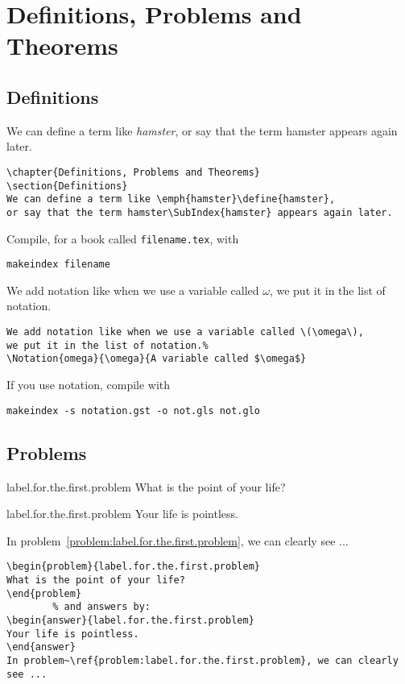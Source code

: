 \chapter{Definitions, Problems and Theorems}
\section{Definitions}
We can define a term like \emph{hamster}, or say that the term hamster appears again later.
\begin{Verbatim}[frame=leftline]
\chapter{Definitions, Problems and Theorems}
\section{Definitions}
We can define a term like \emph{hamster}\define{hamster},
or say that the term hamster\SubIndex{hamster} appears again later.
\end{Verbatim}
Compile, for a book called \verb!filename.tex!, with
\begin{Verbatim}[frame=leftline]
	makeindex filename
\end{Verbatim}
We add notation like when we use a variable called \(\omega\),
we put it in the list of notation.%
\begin{Verbatim}
We add notation like when we use a variable called \(\omega\),
we put it in the list of notation.%
\Notation{omega}{\omega}{A variable called $\omega$}
\end{Verbatim}
If you use notation, compile with
\begin{Verbatim}[frame=leftline]
	makeindex -s notation.gst -o not.gls not.glo
\end{Verbatim}
\section{Problems}
\begin{problem}{label.for.the.first.problem}
What is the point of your life?
\end{problem}
\begin{answer}{label.for.the.first.problem}
Your life is pointless.
\end{answer}
In problem~\ref{problem:label.for.the.first.problem}, we can clearly see ...
\begin{Verbatim}[frame=leftline]
		% We add problems by:
\begin{problem}{label.for.the.first.problem}
What is the point of your life?
\end{problem}
		% and answers by:
\begin{answer}{label.for.the.first.problem}
Your life is pointless.
\end{answer}
In problem~\ref{problem:label.for.the.first.problem}, we can clearly see ...
\end{Verbatim}
